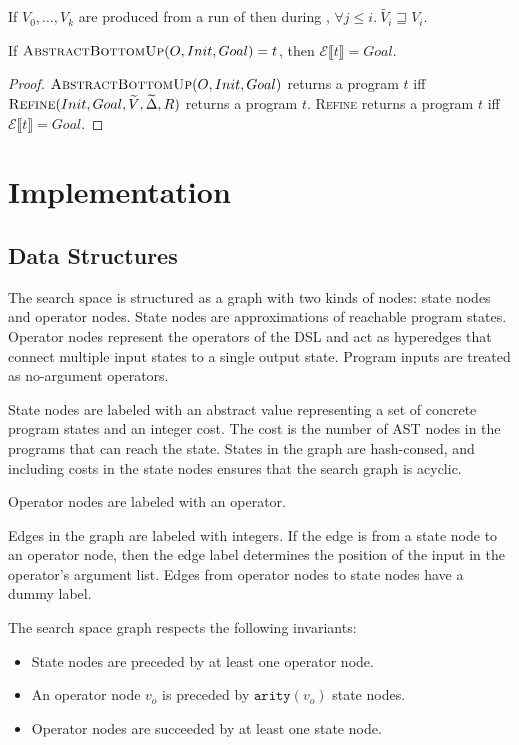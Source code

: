 \documentclass[review]{acmart}
\newcommand{\abs}[1]{\ensuremath{\widetilde{#1}}}
\renewcommand{\eval}[1]{\ensuremath{\mathcal{E}\llbracket#1\rrbracket}}
\begin{document}
\begin{lemma}
  If $V_0, \dots, V_k$ are produced from a run of  then during , $\forall j \leq
  i.\ \abs{V_i} \sqsupseteq V_i$.
\end{lemma}

\begin{theorem}
  If $\Call{AbstractBottomUp}{O, Init, Goal} = t$, then $\eval{t} = Goal$.
\end{theorem}
\begin{proof}
  $\Call{AbstractBottomUp}{O, Init, Goal}$ returns a program $t$ iff
  $\Call{Refine}{Init, Goal, \abs{V}, \abs{\Delta}, R}$ returns a program $t$.
  \textsc{Refine} returns a program $t$ iff $\eval{t} = Goal$.
\end{proof}


\section{Implementation}
\subsection{Data Structures}

The search space is structured as a graph with two kinds of nodes: state nodes
and operator nodes. State nodes are approximations of reachable program states.
Operator nodes represent the operators of the DSL and act as hyperedges that
connect multiple input states to a single output state. Program inputs are
treated as no-argument operators.

State nodes are labeled with an abstract value representing a set of concrete
program states and an integer cost. The cost is the number of AST nodes in the
programs that can reach the state. States in the graph are hash-consed, and
including costs in the state nodes ensures that the search graph is acyclic.

Operator nodes are labeled with an operator.

Edges in the graph are labeled with integers. If the edge is from a state node
to an operator node, then the edge label determines the position of the input in
the operator's argument list. Edges from operator nodes to state nodes have a
dummy label.

The search space graph respects the following invariants:
\begin{itemize}
\item State nodes are preceded by at least one operator node.
\item An operator node $v_o$ is preceded by $\texttt{arity}(v_o)$ state nodes.
\item Operator nodes are succeeded by at least one state node.
\end{itemize}
\end{document}
